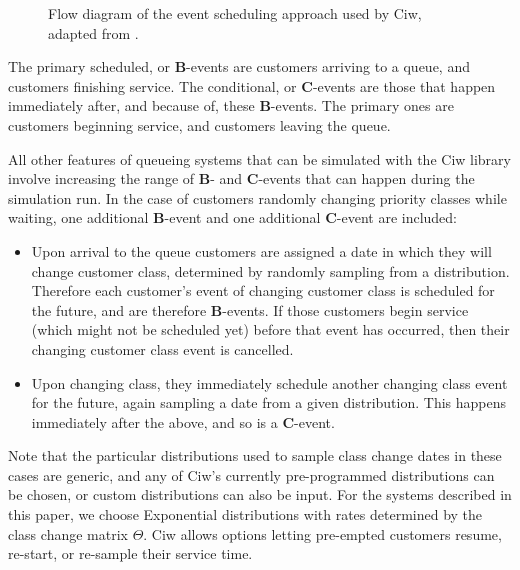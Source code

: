 \documentclass{article}
\begin{document}
\begin{figure}
    \centering
    
    \caption{Flow diagram of the event scheduling approach used by Ciw, adapted from \cite{palmer18}.}
    \label{fig:eventscheduling}
\end{figure}

The primary scheduled, or \textbf{B}-events are customers arriving to a queue,
and customers finishing service. The conditional, or \textbf{C}-events are those
that happen immediately after, and because of, these \textbf{B}-events. The
primary ones are customers beginning service, and customers leaving the queue.

All other features of queueing systems that can be simulated with the Ciw
library involve increasing the range of \textbf{B}- and \textbf{C}-events that
can happen during the simulation run.
In the case of customers randomly changing priority classes while waiting, one
additional \textbf{B}-event and one additional \textbf{C}-event are included:

\begin{itemize}
  \item Upon arrival to the queue customers are assigned a date in which they
  will change customer class, determined by randomly sampling from a
  distribution. Therefore each customer's event of changing customer class is
  scheduled for the future, and are therefore \textbf{B}-events. If those
  customers begin service (which might not be scheduled yet) before that event
  has occurred, then their changing customer class event is cancelled.
  \item Upon changing class, they immediately schedule another changing class
  event for the future, again sampling a date from a given distribution. This
  happens immediately after the above, and so is a \textbf{C}-event.
\end{itemize}

Note that the particular distributions used to sample class change dates in
these cases are generic, and any of Ciw's currently pre-programmed distributions
can be chosen, or custom distributions can also be input. For the systems
described in this paper, we choose Exponential distributions with rates
determined by the class change matrix $\Theta$. Ciw allows options letting
pre-empted customers resume, re-start, or re-sample their service time.
\end{document}
